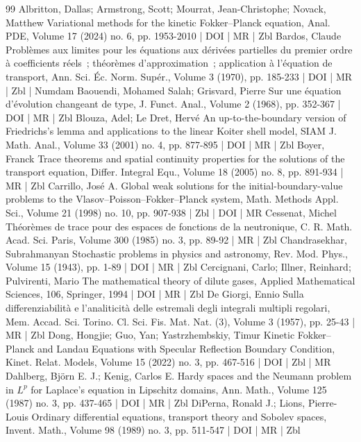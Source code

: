 \documentclass[10pt]{amsart}
\theoremstyle{definition}\newtheorem{defi}[theo]{Definition}\newtheorem{rema}[theo]{Remark}\newtheorem{exam}[theo]{Example}\newtheorem{exem}[theo]{Example}\newtheorem{nota}[theo]{Notation}
\begin{document}
\begin{thebibliography}{99}
 Albritton, Dallas; Armstrong, Scott; Mourrat, Jean-Christophe; Novack, Matthew Variational methods for the kinetic Fokker–Planck equation, Anal. PDE, Volume 17 (2024) no. 6, pp. 1953-2010 | DOI | MR | Zbl
 Bardos, Claude Problèmes aux limites pour les équations aux dérivées partielles du premier ordre à coefficients réels ; théorèmes d’approximation ; application à l’équation de transport, Ann. Sci. Éc. Norm. Supér., Volume 3 (1970), pp. 185-233 | DOI | MR | Zbl | Numdam
 Baouendi, Mohamed Salah; Grisvard, Pierre Sur une équation d’évolution changeant de type, J. Funct. Anal., Volume 2 (1968), pp. 352-367 | DOI | MR | Zbl
 Blouza, Adel; Le Dret, Hervé An up-to-the-boundary version of Friedrichs’s lemma and applications to the linear Koiter shell model, SIAM J. Math. Anal., Volume 33 (2001) no. 4, pp. 877-895 | DOI | MR | Zbl
 Boyer, Franck Trace theorems and spatial continuity properties for the solutions of the transport equation, Differ. Integral Equ., Volume 18 (2005) no. 8, pp. 891-934 | MR | Zbl
 Carrillo, José A. Global weak solutions for the initial-boundary-value problems to the Vlasov–Poisson–Fokker–Planck system, Math. Methods Appl. Sci., Volume 21 (1998) no. 10, pp. 907-938 | Zbl | DOI | MR
 Cessenat, Michel Théorèmes de trace pour des espaces de fonctions de la neutronique, C. R. Math. Acad. Sci. Paris, Volume 300 (1985) no. 3, pp. 89-92 | MR | Zbl
 Chandrasekhar, Subrahmanyan Stochastic problems in physics and astronomy, Rev. Mod. Phys., Volume 15 (1943), pp. 1-89 | DOI | MR | Zbl
 Cercignani, Carlo; Illner, Reinhard; Pulvirenti, Mario The mathematical theory of dilute gases, Applied Mathematical Sciences, 106, Springer, 1994 | DOI | MR | Zbl
 De Giorgi, Ennio Sulla differenziabilità e l’analiticità delle estremali degli integrali multipli regolari, Mem. Accad. Sci. Torino. Cl. Sci. Fis. Mat. Nat. (3), Volume 3 (1957), pp. 25-43 | MR | Zbl
 Dong, Hongjie; Guo, Yan; Yastrzhembskiy, Timur Kinetic Fokker–Planck and Landau Equations with Specular Reflection Boundary Condition, Kinet. Relat. Models, Volume 15 (2022) no. 3, pp. 467-516 | DOI | Zbl | MR
 Dahlberg, Björn E. J.; Kenig, Carlos E. Hardy spaces and the Neumann problem in ${L}^p$ for Laplace’s equation in Lipschitz domains, Ann. Math., Volume 125 (1987) no. 3, pp. 437-465 | DOI | MR | Zbl
 DiPerna, Ronald J.; Lions, Pierre-Louis Ordinary differential equations, transport theory and Sobolev spaces, Invent. Math., Volume 98 (1989) no. 3, pp. 511-547 | DOI | MR | Zbl

\end{thebibliography}
\end{document}
